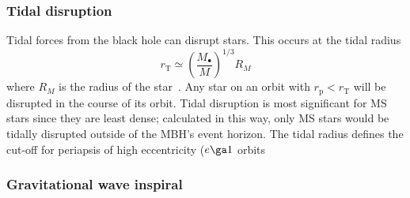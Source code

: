 \documentclass[useAMS,usedcolumn,usegraphicx,usenatbib]{mn2e}
\newcommand{\sub}[1]{\ensuremath{_\mathrm{#1}}}
\begin{document}
\subsubsection{Tidal disruption}

Tidal forces from the black hole can disrupt stars. This occurs at the tidal radius
\begin{equation}
r\sub{T} \simeq \left(\frac{M_\bullet}{M}\right)^{1/3}R_M
\label{eq:Tidal}
\end{equation}
where $R_M$ is the radius of the star~\citep{Kobayashi2004}. Any star on an orbit with $r\sub{p} < r\sub{T}$ will be disrupted in the course of its orbit. Tidal disruption is most significant for MS stars since they are least dense; calculated in this way, only MS stars would be tidally disrupted outside of the MBH's event horizon. The tidal radius defines the cut-off for periapsis of high eccentricity ($e \ga 1$ orbits~\citep{Lightman1977}

\subsubsection{Gravitational wave inspiral}
\end{document}
